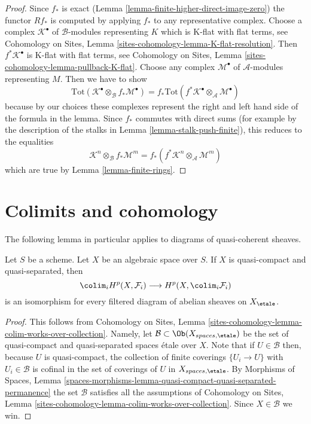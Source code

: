 \begin{proof}
Since $f_*$ is exact (Lemma \ref{lemma-finite-higher-direct-image-zero})
the functor $Rf_*$ is computed by applying $f_*$ to any representative complex.
Choose a complex $\mathcal{K}^\bullet$ of $\mathcal{B}$-modules
representing $K$ which is K-flat with flat terms, see
Cohomology on Sites, Lemma \ref{sites-cohomology-lemma-K-flat-resolution}.
Then $f^*\mathcal{K}^\bullet$ is K-flat with flat terms, see
Cohomology on Sites, Lemma \ref{sites-cohomology-lemma-pullback-K-flat}.
Choose any complex $\mathcal{M}^\bullet$ of $\mathcal{A}$-modules
representing $M$. Then
we have to show
$$
\text{Tot}(\mathcal{K}^\bullet \otimes_\mathcal{B} f_*\mathcal{M}^\bullet)
=
f_*\text{Tot}(f^*\mathcal{K}^\bullet \otimes_\mathcal{A} \mathcal{M}^\bullet)
$$
because by our choices these complexes represent the right and left hand
side of the formula in the lemma.
Since $f_*$ commutes with direct sums
(for example by the description of the stalks in
Lemma \ref{lemma-stalk-push-finite}),
this reduces to the equalities
$$
\mathcal{K}^n \otimes_\mathcal{B} f_*\mathcal{M}^m
=
f_*(f^*\mathcal{K}^n \otimes_\mathcal{A} \mathcal{M}^m)
$$
which are true by Lemma \ref{lemma-finite-rings}.
\end{proof}









\section{Colimits and cohomology}
\label{section-colimits}

\noindent
The following lemma in particular applies to diagrams of quasi-coherent
sheaves.

\begin{lemma}
\label{lemma-colimits}
Let $S$ be a scheme. Let $X$ be an algebraic space over $S$.
If $X$ is quasi-compact and quasi-separated, then
$$
\colim_i H^p(X, \mathcal{F}_i)
\longrightarrow
H^p(X, \colim_i \mathcal{F}_i)
$$
is an isomorphism
for every filtered diagram of abelian sheaves on $X_\etale$.
\end{lemma}

\begin{proof}
This follows from
Cohomology on Sites, Lemma
\ref{sites-cohomology-lemma-colim-works-over-collection}.
Namely, let $\mathcal{B} \subset \Ob(X_{spaces, \etale})$
be the set of quasi-compact and quasi-separated spaces \'etale over $X$.
Note that if $U \in \mathcal{B}$ then, because $U$ is quasi-compact,
the collection of finite coverings $\{U_i \to U\}$ with $U_i \in \mathcal{B}$
is cofinal in the set of coverings of $U$ in $X_{spaces, \etale}$. By
Morphisms of Spaces, Lemma
\ref{spaces-morphisms-lemma-quasi-compact-quasi-separated-permanence}
the set $\mathcal{B}$ satisfies all the assumptions of
Cohomology on Sites, Lemma
\ref{sites-cohomology-lemma-colim-works-over-collection}.
Since $X \in \mathcal{B}$ we win.
\end{proof}

